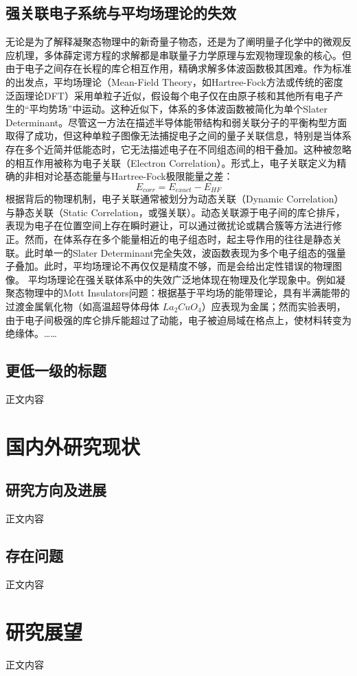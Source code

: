 \documentclass[type=proposal]{wuthesis}
\begin{document}
\begin{refsection}
  \subsection{强关联电子系统与平均场理论的失效}
  无论是为了解释凝聚态物理中的新奇量子物态，还是为了阐明量子化学中的微观反应机理，多体薛定谔方程的求解都是串联量子力学原理与宏观物理现象的核心。但由于电子之间存在长程的库仑相互作用，精确求解多体波函数极其困难。作为标准的出发点，平均场理论（Mean-Field Theory，如Hartree-Fock方法或传统的密度泛函理论DFT）采用单粒子近似，假设每个电子仅在由原子核和其他所有电子产生的“平均势场”中运动。这种近似下，体系的多体波函数被简化为单个Slater Determinant。尽管这一方法在描述半导体能带结构和弱关联分子的平衡构型方面取得了成功，但这种单粒子图像无法捕捉电子之间的量子关联信息，特别是当体系存在多个近简并低能态时，它无法描述电子在不同组态间的相干叠加。这种被忽略的相互作用被称为电子关联（Electron Correlation）。形式上，电子关联定义为精确的非相对论基态能量与Hartree-Fock极限能量之差：
  \begin{equation}
    E_{corr} = E_{exact} - E_{HF}
  \end{equation}
  根据背后的物理机制，电子关联通常被划分为动态关联（Dynamic Correlation）与静态关联（Static Correlation，或强关联）。动态关联源于电子间的库仑排斥，表现为电子在位置空间上存在瞬时避让，可以通过微扰论或耦合簇等方法进行修正。然而，在体系存在多个能量相近的电子组态时，起主导作用的往往是静态关联。此时单一的Slater Determinant完全失效，波函数表现为多个电子组态的强量子叠加。此时，平均场理论不再仅仅是精度不够，而是会给出定性错误的物理图像。
  平均场理论在强关联体系中的失效广泛地体现在物理及化学现象中。例如凝聚态物理中的Mott Insulators问题：根据基于平均场的能带理论，具有半满能带的过渡金属氧化物（如高温超导体母体 $La_{2}CuO_{4}$）应表现为金属；然而实验表明，由于电子间极强的库仑排斥能超过了动能，电子被迫局域在格点上，使材料转变为绝缘体\cite{Imada1998Metal}。……
  \subsection{更低一级的标题}
  正文内容
  \section{国内外研究现状}

  \subsection{研究方向及进展}
  正文内容
  \subsection{存在问题}
  正文内容
  \section{研究展望}
  正文内容
  \printbibliography[heading=bibintoc, title={参考文献}]

\end{refsection}
\end{document}
